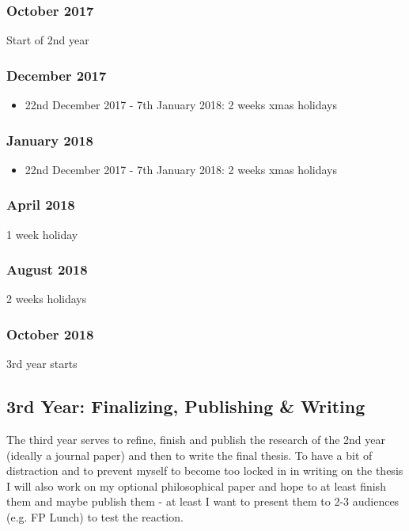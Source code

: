 \subsubsection{October 2017}
Start of 2nd year

\subsubsection{December 2017}
\begin{itemize}
	\item 22nd December 2017 - 7th January 2018: 2 weeks xmas holidays
\end{itemize}

\subsubsection{January 2018}
\begin{itemize}
	\item 22nd December 2017 - 7th January 2018: 2 weeks xmas holidays
\end{itemize}

\subsubsection{April 2018}
1 week holiday

\subsubsection{August 2018}
2 weeks holidays

\subsubsection{October 2018}
3rd year starts



\subsection{3rd Year: Finalizing, Publishing \& Writing}
The third year serves to refine, finish and publish the research of the 2nd year (ideally a journal paper) and then to write the final thesis. To have a bit of distraction and to prevent myself to become too locked in in writing on the thesis I will also work on my optional philosophical paper and hope to at least finish them and maybe publish them - at least I want to present them to 2-3 audiences (e.g. FP Lunch) to test the reaction.

